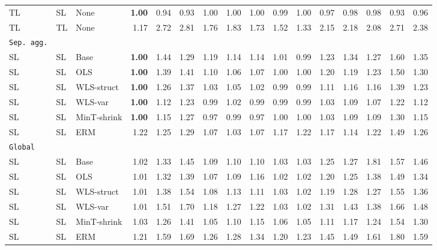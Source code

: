 \documentclass[preprint, 3p, times, twocolumn]{elsarticle}
\begin{document}
\begin{table}
\begin{center}
{\begin{tabular}{l l l  rrrrrrrrrrrrr}
    \hspace{0.1cm} 	TL	&SL	&None	&\textbf{1.00}	&0.94	&0.93	&1.00	&1.00	&1.00	&0.99	&1.00	&0.97	&0.98	&0.98	&0.93	&0.96	\\
    \hspace{0.1cm} 	TL	&TL	&None	&1.17	&2.72	&2.81	&1.76	&1.83	&1.73	&1.52	&1.33	&2.15	&2.18	&2.08	&2.71	&2.38	\\
    \midrule																	
    \texttt{Sep. agg.}																	\\
    \hspace{0.1cm} 	SL	&SL	&Base	&\textbf{1.00}	&1.44	&1.29	&1.19	&1.14	&1.14	&1.01	&0.99	&1.23	&1.34	&1.27	&1.60	&1.35	\\
    \hspace{0.1cm} 	SL	&SL	&OLS	&\textbf{1.00}	&1.39	&1.41	&1.10	&1.06	&1.07	&1.00	&1.00	&1.20	&1.19	&1.23	&1.50	&1.30	\\
    \hspace{0.1cm} 	SL	&SL	&WLS-struct	&\textbf{1.00}	&1.26	&1.37	&1.03	&1.05	&1.02	&0.99	&0.99	&1.11	&1.16	&1.16	&1.39	&1.23	\\
    \hspace{0.1cm} 	SL	&SL	&WLS-var	&\textbf{1.00}	&1.12	&1.23	&0.99	&1.02	&0.99	&0.99	&0.99	&1.03	&1.09	&1.07	&1.22	&1.12	\\
    \hspace{0.1cm} 	SL	&SL	&MinT-shrink	&\textbf{1.00}	&1.15	&1.27	&0.97	&0.99	&0.97	&1.00	&1.00	&1.03	&1.09	&1.09	&1.30	&1.15	\\
    \hspace{0.1cm} 	SL	&SL	&ERM	&1.22	&1.25	&1.29	&1.07	&1.03	&1.07	&1.17	&1.22	&1.17	&1.14	&1.22	&1.49	&1.26	\\
    \midrule																	
    \texttt{Global}																	\\
    \hspace{0.1cm} 	SL	&SL	&Base	&1.02	&1.33	&1.45	&1.09	&1.10	&1.10	&1.03	&1.03	&1.25	&1.27	&1.81	&1.57	&1.46	\\
    \hspace{0.1cm} 	SL	&SL	&OLS	&1.01	&1.32	&1.39	&1.07	&1.09	&1.16	&1.02	&1.02	&1.20	&1.25	&1.38	&1.49	&1.34	\\
    \hspace{0.1cm} 	SL	&SL	&WLS-struct	&1.01	&1.38	&1.54	&1.08	&1.13	&1.11	&1.03	&1.02	&1.19	&1.28	&1.27	&1.55	&1.36	\\
    \hspace{0.1cm} 	SL	&SL	&WLS-var	&1.01	&1.51	&1.70	&1.18	&1.27	&1.22	&1.03	&1.02	&1.31	&1.43	&1.38	&1.66	&1.48	\\
    \hspace{0.1cm} 	SL	&SL	&MinT-shrink	&1.03	&1.26	&1.41	&1.05	&1.10	&1.15	&1.06	&1.05	&1.11	&1.17	&1.24	&1.54	&1.30	\\
    \hspace{0.1cm} 	SL	&SL	&ERM	&1.21	&1.59	&1.69	&1.26	&1.28	&1.34	&1.20	&1.23	&1.45	&1.49	&1.61	&1.80	&1.59	\\      
    \bottomrule
    \end{tabular}}
    \end{center}
    \end{table}
\end{document}
